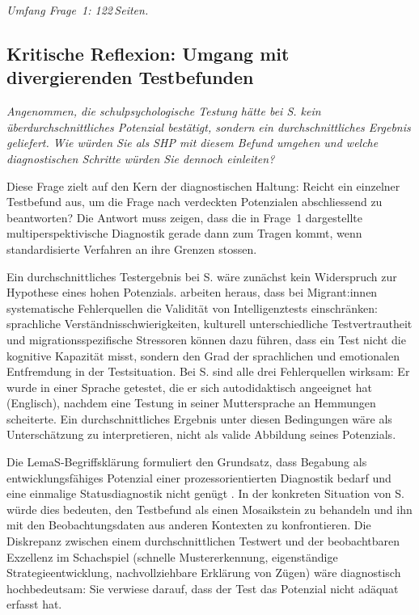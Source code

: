 \documentclass[ngerman, a4paper]{article}
\begin{document}
\textit{Umfang Frage~1: 122\,Seiten.}
 

 

\subsection{Kritische Reflexion: Umgang mit divergierenden Testbefunden}


\begin{tcolorbox}[colback=gray!5, colframe=gray!50, title=Weiterführende Diskurslinie]
\itshape
Angenommen, die schulpsychologische Testung hätte bei S. kein überdurchschnittliches
Potenzial bestätigt, sondern ein durchschnittliches Ergebnis geliefert. Wie würden Sie
als SHP mit diesem Befund umgehen und welche diagnostischen Schritte würden Sie
dennoch einleiten?
\end{tcolorbox}

Diese Frage zielt auf den Kern der diagnostischen Haltung: Reicht ein einzelner
Testbefund aus, um die Frage nach verdeckten Potenzialen abschliessend zu beantworten?
Die Antwort muss zeigen, dass die in Frage~1 dargestellte multiperspektivische
Diagnostik gerade dann zum Tragen kommt, wenn standardisierte Verfahren an ihre
Grenzen stossen.

Ein durchschnittliches Testergebnis bei S. wäre zunächst kein Widerspruch zur
Hypothese eines hohen Potenzials. \textcite[Kap.\,1--2]{maehler2018diagnostik} arbeiten heraus, dass bei
Migrant:innen systematische Fehlerquellen die Validität von Intelligenztests
einschränken: sprachliche Verständnisschwierigkeiten, kulturell unterschiedliche
Testvertrautheit und migrationsspezifische Stressoren können dazu führen, dass ein
Test nicht die kognitive Kapazität misst, sondern den Grad der sprachlichen und
emotionalen Entfremdung in der Testsituation. Bei S. sind alle drei Fehlerquellen
wirksam: Er wurde in einer Sprache getestet, die er sich autodidaktisch angeeignet
hat (Englisch), nachdem eine Testung in seiner Muttersprache an Hemmungen scheiterte.
Ein durchschnittliches Ergebnis unter diesen Bedingungen wäre als Unterschätzung zu
interpretieren, nicht als valide Abbildung seines Potenzials.

Die LemaS-Begriffsklärung formuliert den Grundsatz, dass Begabung als
entwicklungsfähiges Potenzial einer prozessorientierten Diagnostik bedarf und eine
einmalige Statusdiagnostik nicht genügt \parencite{lemas2023begriffsklaerung}. In
der konkreten Situation von S. würde dies bedeuten, den Testbefund als einen
Mosaikstein zu behandeln und ihn mit den Beobachtungsdaten aus anderen Kontexten
zu konfrontieren. Die Diskrepanz zwischen einem durchschnittlichen Testwert und der
beobachtbaren Exzellenz im Schachspiel (schnelle Mustererkennung, eigenständige
Strategieentwicklung, nachvollziehbare Erklärung von Zügen) wäre diagnostisch
hochbedeutsam: Sie verwiese darauf, dass der Test das Potenzial nicht adäquat
erfasst hat.
\end{document}
